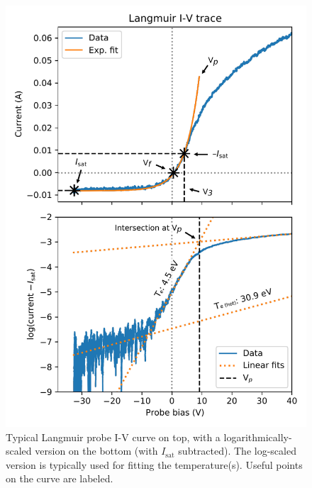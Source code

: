 \begin{figure}
	\centering
	\includegraphics[height=0.8\textheight]{figures/example_sweep_analysis.pdf}
	\caption[Typical Langmuir probe I-V curve]{\label{fig:langmuir_sweep}Typical Langmuir probe I-V curve on top, with a logarithmically-scaled version on the bottom (with $I_\text{sat}$ subtracted). The log-scaled version is typically used for fitting the temperature(s). Useful points on the curve are labeled.}
\end{figure}

